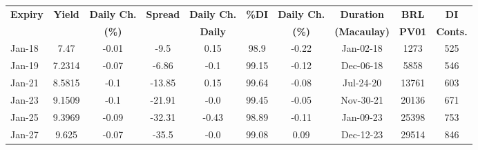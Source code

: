 \documentclass[article,crop=false]{standalone}%
\begin{document}
%
\normalsize%
\setlength{\tabcolsep}{0.15cm}%
\begin{tabular}[h]{l|c c|c c|c c|c c c}%
\hline%
\rowcolor{white}%
\textbf{Expiry}&\textbf{Yield}&\textbf{Daily Ch.}&\textbf{Spread}&\textbf{Daily Ch.}&\textbf{\%DI}&\textbf{Daily Ch.}&\textbf{Duration}&\textbf{BRL}&\textbf{DI}\\%
\rowcolor{white}%
\textbf{}&\textbf{}&\textbf{(\%)}&\textbf{}&\textbf{Daily}&\textbf{}&\textbf{(\%)}&\textbf{(Macaulay)}&\textbf{PV01}&\textbf{Conts.}\\%
\hline%
\rowcolor{lightgray}%
Jan{-}18&7.47&{-}0.01&{-}9.5&0.15&98.9&{-}0.22&Jan{-}02{-}18&1273&525\\%
\rowcolor{white}%
Jan{-}19&7.2314&{-}0.07&{-}6.86&{-}0.1&99.15&{-}0.12&Dec{-}06{-}18&5858&546\\%
\rowcolor{lightgray}%
Jan{-}21&8.5815&{-}0.1&{-}13.85&0.15&99.64&{-}0.08&Jul{-}24{-}20&13761&603\\%
\rowcolor{white}%
Jan{-}23&9.1509&{-}0.1&{-}21.91&{-}0.0&99.45&{-}0.05&Nov{-}30{-}21&20136&671\\%
\rowcolor{lightgray}%
Jan{-}25&9.3969&{-}0.09&{-}32.31&{-}0.43&98.89&{-}0.11&Jan{-}09{-}23&25398&753\\%
\rowcolor{white}%
Jan{-}27&9.625&{-}0.07&{-}35.5&{-}0.0&99.08&0.09&Dec{-}12{-}23&29514&846\\%
\hline%
\end{tabular}%
\end{document}

